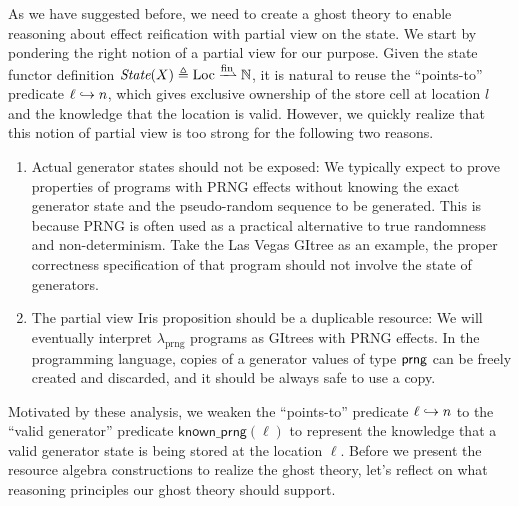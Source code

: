\documentclass{article}
\theoremstyle{definition}
\theoremstyle{plain}
\theoremstyle{remark}
\newcommand{\prng}{\mathrm{prng}}
\newcommand{\easgn}{\;\syn{\mathrel{:=}}\;}
\newcommand{\knownprng}{\textsf{known\_prng}}
\newcommand{\hasprngs}{\textsf{has\_prngs}}
\begin{document}
As we have suggested before, we need to create a ghost theory to enable reasoning about effect reification with partial view on the state.
We start by pondering the right notion of a partial view for our purpose.
Given the state functor definition \(\State(X) \eqdef \iLoc \fpfn \mathbb{N}\), it is natural to reuse the ``points-to'' predicate \(\ell\hookrightarrow n\), which gives exclusive ownership of the store cell at location \(l\) and the knowledge that the location is valid.
However, we quickly realize that this notion of partial view is too strong for the following two reasons.
\begin{enumerate}
  \item Actual generator states should not be exposed:
    We typically expect to prove properties of programs with PRNG effects without knowing the exact generator state and the pseudo-random sequence to be generated.
    This is because PRNG is often used as a practical alternative to true randomness and non-determinism.
    Take the Las Vegas GItree as an example, the proper correctness specification of that program should not involve the state of generators.
  \item The partial view Iris proposition should be a duplicable resource:
    We will eventually interpret \(\lambda_\prng\) programs as GItrees with PRNG effects.
    In the programming language, copies of a generator values of type \({ {\mathsf{prng}}}\) can be freely created and discarded,
    and it should be always safe to use a copy.
\end{enumerate}
Motivated by these analysis, we weaken the ``points-to'' predicate \(\ell\hookrightarrow n\) to the ``valid generator'' predicate \(\knownprng(\ell)\) to represent the knowledge that a valid generator state is being stored at the location \(\ell\).
Before we present the resource algebra constructions to realize the ghost theory, let's reflect on what reasoning principles our ghost theory should support.

\end{document}
